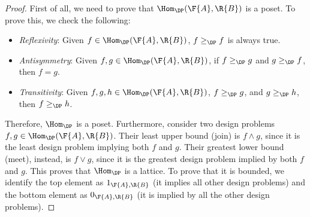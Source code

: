 \begin{proof}
First of all, we need to prove that $\Hom_\DP(\F{A},\R{B})$ is a poset. To prove this, we check the following:

\begin{itemize}
    \item \emph{Reflexivity}: Given $f\in \Hom_\DP(\F{A},\R{B})$, $f\geq_\DP f$ is always true.
    \item \emph{Antisymmetry}: Given $f,g\in \Hom_\DP(\F{A},\R{B})$, if $f\geq_\DP g$ and $g\geq_\DP f$, then $f=g$.
    \item \emph{Transitivity}: Given $f,g,h\in \Hom_\DP(\F{A},\R{B})$, $f\geq_\DP g$, and $g\geq_\DP h$, then $f\geq_\DP h$.
\end{itemize}
Therefore, $\Hom_\DP$ is a poset. Furthermore, consider two design problems $f,g\in \Hom_\DP(\F{A},\R{B})$. Their least upper bound (join) is $f\wedge g$, since it is the least design problem implying both $f$ and $g$. Their greatest lower bound (meet), instead, is $f\vee g$, since it is the greatest design problem implied by both $f$ and $g$. This proves that $\Hom_\DP$ is a lattice. To prove that it is bounded, we identify the top element as $1_{\F{A},\R{B}}$ (it implies all other design problems) and the bottom element as $0_{\F{A},\R{B}}$ (it is implied by all the other design problems).
\end{proof}


